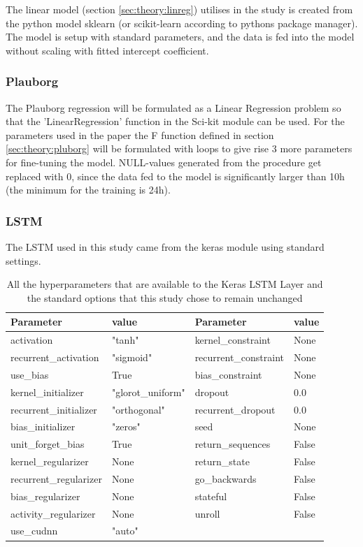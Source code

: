 The linear model (section \ref{sec:theory:linreg}) utilises in the study is created from the python model sklearn (or scikit-learn according to pythons package manager). The model is setup with standard parameters, and the data is fed into the model without scaling with fitted intercept coefficient. 

\subsubsection{Plauborg}

The Plauborg regression will be formulated as a Linear Regression problem so that the 'LinearRegression' function in the Sci-kit module can be used. For the parameters used in the paper\cite{plauborg_simple_2002} the F function defined in section \ref{sec:theory:pluborg} will be formulated with loops to give rise 3 more parameters for fine-tuning the model. NULL-values generated from the procedure get replaced with 0, since the data fed to the model is significantly larger than 10h (the minimum for the training is 24h).

\subsubsection{LSTM}

The LSTM used in this study came from the keras module using standard settings.

\begin{table}
	\centering
	\begin{tabular}{l|l|l|l}
		Parameter&value&Parameter&value\\\hline
		activation&"tanh"&kernel\_constraint&None\\
		recurrent\_activation&"sigmoid"&recurrent\_constraint&None\\
		use\_bias&True&bias\_constraint&None\\
		kernel\_initializer&"glorot\_uniform"&dropout&0.0\\
		recurrent\_initializer&"orthogonal"&recurrent\_dropout&0.0\\
		bias\_initializer&"zeros"&seed&None\\
		unit\_forget\_bias&True&return\_sequences&False\\
		kernel\_regularizer&None&return\_state&False\\
		recurrent\_regularizer&None&go\_backwards&False\\
		bias\_regularizer&None&stateful&False\\
		activity\_regularizer&None&unroll&False\\
		use\_cudnn&"auto"&&
	\end{tabular}
	\caption[LSTM standard paramters]{All the hyperparameters that are available to the Keras LSTM Layer and the standard options that this study chose to remain unchanged}
	\label{tab:lstm:params}
\end{table}

